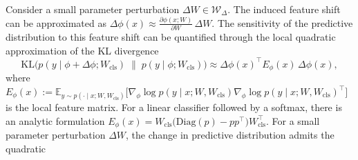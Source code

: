 \documentclass[10pt]{article} %
\begin{document}
Consider a small parameter perturbation $\Delta W \in \mathcal{W}_\Delta$. The induced feature shift can be
approximated as
$
\Delta \phi(x)
\approx
\frac{\partial \phi(x; W)}{\partial W} \,\Delta W.
$
The sensitivity of the predictive distribution to this feature shift can be quantified through the local
quadratic approximation of the KL divergence
$$
\mathrm{KL}\big(
p(y \mid \phi + \Delta \phi; W_{\mathrm{cls}})
\;\big\|\;
p(y \mid \phi; W_{\mathrm{cls}})
\big)
\approx
\Delta \phi(x)^\top E_\phi(x) \,\Delta \phi(x),
$$
where $
E_\phi(x)
:=
\mathbb{E}_{y \sim p(\cdot \mid x;W,W_{\mathrm{cls}})}
\Big[
\nabla_\phi \log p(y \mid x; W, W_{\mathrm{cls}})
\nabla_\phi \log p(y \mid x; W, W_{\mathrm{cls}})^\top
\Big]
$
is the local feature matrix. For a linear classifier followed by a softmax, there is an analytic formulation
$  E_\phi(x)
=
W_{\mathrm{cls}}
 \Big(
 \mathrm{Diag}(p) - p p^\top
 \Big)
 W_{\mathrm{cls}}^\top.
 $
For a small parameter perturbation $\Delta W$, the change in predictive distribution admits the quadratic
\end{document}
